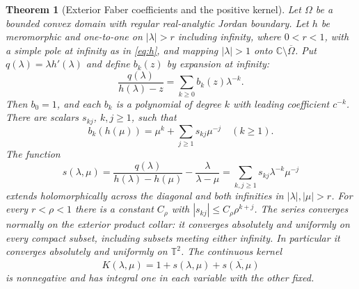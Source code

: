 \documentclass[11pt]{article}
\newcommand{\C}{\mathbb C}
\newcommand{\T}{\mathbb T}
\newtheorem{theorem}{Theorem}[section]
\theoremstyle{remark}\newtheorem{remark}[theorem]{Remark}
\numberwithin{equation}{section}
\begin{document}
\begin{theorem}[Exterior Faber coefficients and the positive kernel]\label{lem:faber}
Let $\Omega$ be a bounded convex domain with regular real-analytic Jordan boundary. Let $h$ be meromorphic and one-to-one on $|\lambda|>r$ including infinity, where $0<r<1$, with a simple pole at infinity as in \eqref{eq:h}, and mapping $|\lambda|>1$ onto $\C\setminus\overline\Omega$. Put $q(\lambda)=\lambda h'(\lambda)$ and define $b_k(z)$ by expansion at infinity:
\begin{equation}\label{eq:faber}
 \frac{q(\lambda)}{h(\lambda)-z}=\sum_{k\ge0}b_k(z)\lambda^{-k}.
\end{equation}
Then $b_0=1$, and each $b_k$ is a polynomial of degree $k$ with leading coefficient $c^{-k}$. There are scalars $s_{kj}$, $k,j\ge1$, such that
\begin{equation}\label{eq:boundary-basis}
 b_k(h(\mu))=\mu^k+\sum_{j\ge1}s_{kj}\mu^{-j}\quad(k\ge1).
\end{equation}
The function
\begin{equation}\label{eq:s}
 s(\lambda,\mu)=\frac{q(\lambda)}{h(\lambda)-h(\mu)}-\frac{\lambda}{\lambda-\mu}
 =\sum_{k,j\ge1}s_{kj}\lambda^{-k}\mu^{-j}
\end{equation}
extends holomorphically across the diagonal and both infinities in $|\lambda|,|\mu|>r$. For every $r<\rho<1$ there is a constant $C_\rho$ with
$|s_{kj}|\le C_\rho\rho^{k+j}$. The series converges normally on
the exterior product collar: it converges absolutely and uniformly on
every compact subset, including subsets meeting either infinity.
In particular it converges absolutely and uniformly on $\T^2$. The continuous kernel
\[
 K(\lambda,\mu)=1+s(\lambda,\mu)+\overline{s(\lambda,\mu)}
\]
is nonnegative and has integral one in each variable with the other fixed.
\end{theorem}
\end{document}
